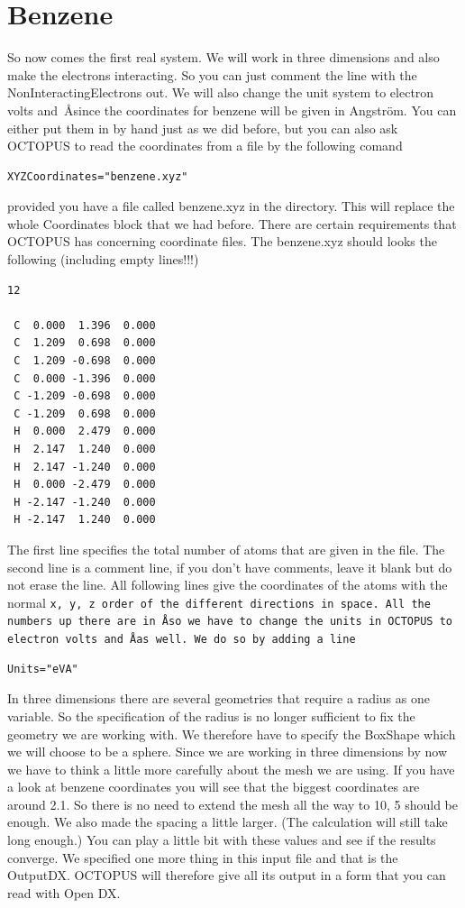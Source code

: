 \documentclass{article}
\begin{document}
\section{Benzene}

So now comes the first real system. We will work in three dimensions and also
make the electrons interacting. So you can just comment the line with the
NonInteractingElectrons out. We will also change the unit system to electron
volts and~\AA since the coordinates for benzene will be given in
Angstr\"om. You can either put them in by hand just as we did before, but you
can also ask OCTOPUS to read the coordinates from a file by the following comand

\begin{verbatim}
XYZCoordinates="benzene.xyz"
\end{verbatim}

provided you have a file called benzene.xyz in the directory. This will replace
the whole Coordinates block that we had before. There are certain
requirements that OCTOPUS has concerning coordinate files. The benzene.xyz
should looks the following (including empty lines!!!)

\begin{verbatim}
12

 C  0.000  1.396  0.000
 C  1.209  0.698  0.000
 C  1.209 -0.698  0.000
 C  0.000 -1.396  0.000
 C -1.209 -0.698  0.000
 C -1.209  0.698  0.000
 H  0.000  2.479  0.000
 H  2.147  1.240  0.000
 H  2.147 -1.240  0.000
 H  0.000 -2.479  0.000
 H -2.147 -1.240  0.000
 H -2.147  1.240  0.000
\end{verbatim}

The first line specifies the total number of atoms that are given in the file.
The second line is a comment line, if you don't have comments, leave it blank
but do not erase the line. All following lines give the coordinates of the atoms
with the normal \tt x, y, z \rm order of the different directions in space. All
the numbers up there are in \AA so we have to change the units in OCTOPUS
to electron volts and \AA as well. We do so by adding a line

\begin{verbatim}
Units="eVA"
\end{verbatim}

In three dimensions there are several geometries that require a radius as one
variable. So the specification of the radius is no longer sufficient to fix the
geometry we are working with. We therefore have to specify the BoxShape which
we will choose to be a sphere. Since we are working in three dimensions by now
we have to think a little more carefully about the mesh we are using. If you
have a look at benzene coordinates you will see that the biggest coordinates
are around 2.1. So there is no need to extend the mesh all the way to 10, 5
should be enough. We also made the spacing a little larger. (The calculation
will still take long enough.) You can play a little bit with these values and
see if the results converge. We specified one more thing in this input file and
that is the OutputDX. OCTOPUS will therefore give all its output in a form that
you can read with Open DX. 
\end{document}
